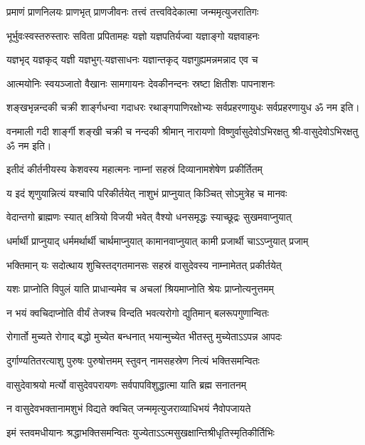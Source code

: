 \twolineshloka
{प्रमाणं प्राणनिलयः प्राणभृत् प्राणजीवनः}
{तत्त्वं तत्त्वविदेकात्मा जन्ममृत्युजरातिगः}

\twolineshloka
{भूर्भुवःस्वस्तरुस्तारः सविता प्रपितामहः}
{यज्ञो यज्ञपतिर्यज्वा यज्ञाङ्गो यज्ञवाहनः}

\twolineshloka
{यज्ञभृद् यज्ञकृद् यज्ञी यज्ञभुग्-यज्ञसाधनः}
{यज्ञान्तकृद् यज्ञगुह्यमन्नमन्नाद एव च}

\twolineshloka
{आत्मयोनिः स्वयञ्जातो वैखानः सामगायनः}
{देवकीनन्दनः स्रष्टा क्षितीशः पापनाशनः}

\twolineshloka
{शङ्खभृन्नन्दकी चक्री शार्ङ्गधन्वा गदाधरः}
{रथाङ्गपाणिरक्षोभ्यः सर्वप्रहरणायुधः}
सर्वप्रहरणायुध ॐ नम इति।

\twolineshloka
{वनमाली गदी शार्ङ्गी शङ्खी चक्री च नन्दकी}
{श्रीमान् नारायणो विष्णुर्वासुदेवोऽभिरक्षतु}%
श्री-वासुदेवोऽभिरक्षतु ॐ नम इति।

\resetShloka
\twolineshloka
{इतीदं कीर्तनीयस्य केशवस्य महात्मनः}
{नाम्नां सहस्रं दिव्यानामशेषेण प्रकीर्तितम्}

\twolineshloka
{य इदं शृणुयान्नित्यं यश्चापि परिकीर्तयेत्}
{नाशुभं प्राप्नुयात् किञ्चित् सोऽमुत्रेह च मानवः}

\twolineshloka
{वेदान्तगो ब्राह्मणः स्यात् क्षत्रियो विजयी भवेत्}
{वैश्यो धनसमृद्धः स्याच्छूद्रः सुखमवाप्नुयात्}

\twolineshloka
{धर्मार्थी प्राप्नुयाद् धर्ममर्थार्थी चार्थमाप्नुयात्}
{कामानवाप्नुयात् कामी प्रजार्थी चाऽऽप्नुयात् प्रजाम्}

\twolineshloka
{भक्तिमान् यः सदोत्थाय शुचिस्तद्गतमानसः}
{सहस्रं वासुदेवस्य नाम्नामेतत् प्रकीर्तयेत्}

\twolineshloka
{यशः प्राप्नोति विपुलं याति प्राधान्यमेव च}
{अचलां श्रियमाप्नोति श्रेयः प्राप्नोत्यनुत्तमम्}

\twolineshloka
{न भयं क्वचिदाप्नोति वीर्यं तेजश्च विन्दति}
{भवत्यरोगो द्युतिमान् बलरूपगुणान्वितः}

\twolineshloka
{रोगार्तो मुच्यते रोगाद् बद्धो मुच्येत बन्धनात्}
{भयान्मुच्येत भीतस्तु मुच्येताऽऽपन्न आपदः}

\twolineshloka
{दुर्गाण्यतितरत्याशु पुरुषः पुरुषोत्तमम्}
{स्तुवन् नामसहस्रेण नित्यं भक्तिसमन्वितः}

\twolineshloka
{वासुदेवाश्रयो मर्त्यो वासुदेवपरायणः}
{सर्वपापविशुद्धात्मा याति ब्रह्म सनातनम्}

\twolineshloka
{न वासुदेवभक्तानामशुभं विद्यते क्वचित्}
{जन्ममृत्युजराव्याधिभयं नैवोपजायते}

\twolineshloka
{इमं स्तवमधीयानः श्रद्धाभक्तिसमन्वितः}
{युज्येताऽऽत्मसुखक्षान्तिश्रीधृतिस्मृतिकीर्तिभिः}

